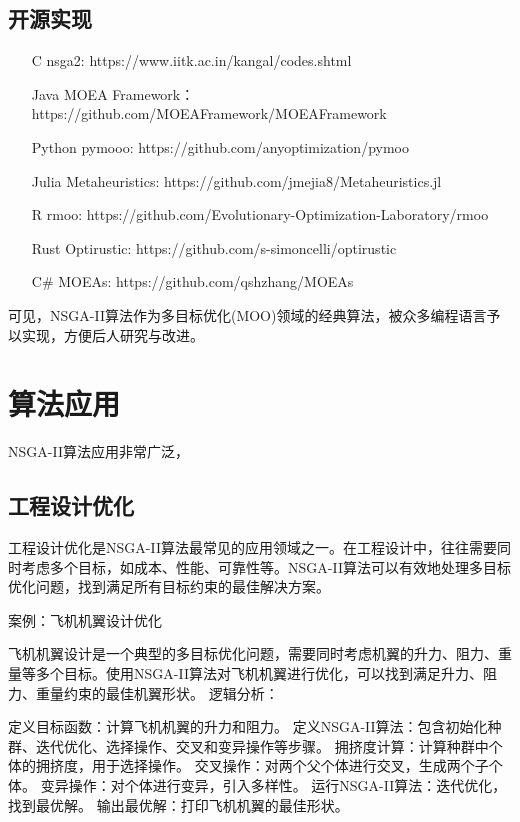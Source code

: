 \documentclass[lang=cn,a4paper,citestyle=gb7714-2015, bibstyle=gb7714-2015]{elegantpaper}
\begin{document}
    \subsection{开源实现}

    \begin{enumerate}
        \item[C]nsga2: https://www.iitk.ac.in/kangal/codes.shtml
        \item[Java]MOEA Framework：https://github.com/MOEAFramework/MOEAFramework
        \item[Python]pymooo: https://github.com/anyoptimization/pymoo
        \item[Julia]Metaheuristics: https://github.com/jmejia8/Metaheuristics.jl
        \item[R]rmoo: https://github.com/Evolutionary-Optimization-Laboratory/rmoo
        \item[Rust]Optirustic: https://github.com/s-simoncelli/optirustic
        \item[C\#]MOEAs: https://github.com/qshzhang/MOEAs
    \end{enumerate}

    可见，NSGA-II算法作为多目标优化(MOO)领域的经典算法，被众多编程语言予以实现，方便后人研究与改进。
    \section{算法应用}
    NSGA-II算法应用非常广泛，

    \subsection{工程设计优化}

    工程设计优化是NSGA-II算法最常见的应用领域之一。在工程设计中，往往需要同时考虑多个目标，如成本、性能、可靠性等。NSGA-II算法可以有效地处理多目标优化问题，找到满足所有目标约束的最佳解决方案。

    案例：飞机机翼设计优化

    飞机机翼设计是一个典型的多目标优化问题，需要同时考虑机翼的升力、阻力、重量等多个目标。使用NSGA-II算法对飞机机翼进行优化，可以找到满足升力、阻力、重量约束的最佳机翼形状。
    逻辑分析：

    定义目标函数：计算飞机机翼的升力和阻力。
    定义NSGA-II算法：包含初始化种群、迭代优化、选择操作、交叉和变异操作等步骤。
    拥挤度计算：计算种群中个体的拥挤度，用于选择操作。
    交叉操作：对两个父个体进行交叉，生成两个子个体。
    变异操作：对个体进行变异，引入多样性。
    运行NSGA-II算法：迭代优化，找到最优解。
    输出最优解：打印飞机机翼的最佳形状。
\end{document}
